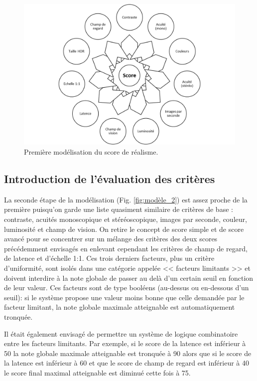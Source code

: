 	\begin{figure}
		\centering
		\includegraphics[scale=.8]{Figures/Modele1_2}
		\caption{Première modélisation du score de réalisme.}
		\label{fig:modèle_1}
	\end{figure}
	
	\subsection{Introduction de l'évaluation des critères}
	\par La seconde étape de la modélisation  (Fig. \ref{fig:modèle_2}) est assez proche de la première puisqu'on garde une liste quasiment similaire de critères de base : contraste, acuités monoscopique et stéréoscopique, images par seconde, couleur, luminosité et champ de vision. On retire le concept de score simple et de score avancé pour se concentrer sur un mélange des critères des deux scores précédemment envisagés en enlevant cependant les critères de champ de regard, de latence et d'échelle 1:1. Ces trois derniers facteurs, plus un critère d'uniformité, sont isolés dans une catégorie appelée << facteurs limitants >> et doivent interdire à la note globale de passer au delà d'un certain seuil en fonction de leur valeur. Ces facteurs sont de type booléens (au-dessus ou en-dessous d'un seuil): si le système propose une valeur moins bonne que celle demandée par le facteur limitant, la note globale maximale atteignable est automatiquement tronquée.
	
	\par Il était également envisagé de permettre un système de logique combinatoire entre les facteurs limitants. Par exemple, si le score de la latence est inférieur à 50 la note globale maximale atteignable est tronquée à 90 alors que si le score de la latence est inférieur à 60 et que le score de champ de regard est inférieur à 40 le score final maximal atteignable est diminué cette fois à 75.
	
